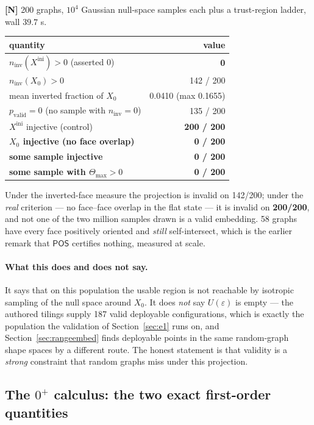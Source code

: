 \documentclass[11pt,a4paper]{article}
\theoremstyle{definition}
\newcommand{\Tmax}{\Theta_{\max}}
\newcommand{\POS}{\textsf{POS}}
\begin{document}
\textbf{[N]} 200 graphs, $10^4$ Gaussian null-space samples each plus a trust-region ladder,
wall $39.7$ s.

\begin{center}
\small
\begin{tabular}{@{}lr@{}}
\toprule
quantity & value \\
\midrule
$n_{\mathrm{inv}}(X^{\mathrm{ini}})>0$ (asserted 0) & \textbf{0} \\
$n_{\mathrm{inv}}(X_0)>0$ & 142 / 200 \\
mean inverted fraction of $X_0$ & 0.0410 (max 0.1655) \\
$p_{\mathrm{valid}}=0$ (no sample with $n_{\mathrm{inv}}=0$) & 135 / 200 \\
$X^{\mathrm{ini}}$ injective (control) & \textbf{200 / 200} \\
\textbf{$X_0$ injective (no face overlap)} & \textbf{0 / 200} \\
\textbf{some sample injective} & \textbf{0 / 200} \\
\textbf{some sample with $\Tmax>0$} & \textbf{0 / 200} \\
\bottomrule
\end{tabular}
\end{center}

\noindent Under the inverted-face measure the projection is invalid on 142/200; under the
\emph{real} criterion --- no face--face overlap in the flat state --- it is invalid on
\textbf{200/200}, and not one of the two million samples drawn is a valid embedding. 58 graphs
have every face positively oriented and \emph{still} self-intersect, which is the earlier
remark that $\POS$ certifies nothing, measured at scale.

\paragraph{What this does and does not say.} It says that on this population the usable region
is not reachable by isotropic sampling of the null space around $X_0$. It does \emph{not} say
$U(\varepsilon)$ is empty --- the authored tilings supply 187 valid deployable configurations,
which is exactly the population the validation of Section~\ref{sec:e1} runs on, and
Section~\ref{sec:rangeembed} finds deployable points in the same random-graph shape spaces by
a different route. The honest statement is that validity is a \emph{strong} constraint that
random graphs miss under this projection.

\subsection{The \texorpdfstring{$0^+$}{0+} calculus: the two exact first-order quantities}
\label{sec:zeroplus}
\end{document}
